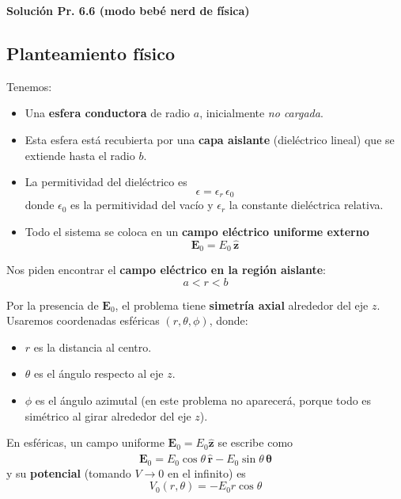 \documentclass{article}
\begin{document}
\textcolor{Cinnabar}{\textbf{Solución Pr. 6.6 (modo bebé nerd de física)}} \vspace{0.4cm}

\subsection*{Planteamiento físico}

Tenemos:

\begin{itemize}
  \item Una \textbf{esfera conductora} de radio $a$, inicialmente \emph{no cargada}.
  \item Esta esfera está recubierta por una \textbf{capa aislante} (dieléctrico lineal) que se extiende hasta el radio $b$.
  \item La permitividad del dieléctrico es
    \begin{equation}
      \epsilon = \epsilon_{r}\,\epsilon_{0}
      \label{eq:eps-def}
    \end{equation}
    donde $\epsilon_{0}$ es la permitividad del vacío y $\epsilon_{r}$ la constante dieléctrica relativa.
  \item Todo el sistema se coloca en un \textbf{campo eléctrico uniforme externo}
    \begin{equation}
      \mathbf{E}_{0} = E_{0}\,\hat{\mathbf{z}}
      \label{eq:E0}
    \end{equation}
\end{itemize}

Nos piden encontrar el \textbf{campo eléctrico en la región aislante}:
\[
a < r < b
\]

Por la presencia de $\mathbf{E}_{0}$, el problema tiene \textbf{simetría axial} alrededor del eje $z$. Usaremos coordenadas esféricas $(r,\theta,\phi)$, donde:

\begin{itemize}
  \item $r$ es la distancia al centro.
  \item $\theta$ es el ángulo respecto al eje $z$.
  \item $\phi$ es el ángulo azimutal (en este problema no aparecerá, porque todo es simétrico al girar alrededor del eje $z$).
\end{itemize}

En esféricas, un campo uniforme $\mathbf{E}_{0} = E_{0}\hat{\mathbf{z}}$ se escribe como
\[
\mathbf{E}_{0} = E_{0}\cos\theta\,\hat{\mathbf{r}} - E_{0}\sin\theta\,\hat{\boldsymbol{\theta}}
\]
y su \textbf{potencial} (tomando $V\to 0$ en el infinito) es
\[
V_{0}(r,\theta) = -E_{0}r\cos\theta
\]
\end{document}
